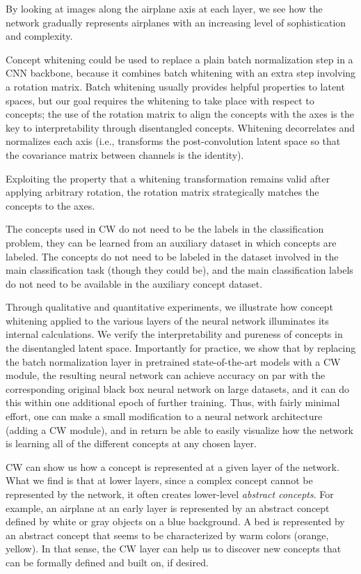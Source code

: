 \documentclass{article}
\begin{document}
By looking at images along the airplane axis at each layer, we see how the network gradually represents airplanes with an increasing level of sophistication and complexity. 

Concept whitening could be used to replace a plain batch normalization step in a CNN backbone, because it combines batch whitening with an extra step involving a rotation matrix. Batch whitening usually provides helpful properties to latent spaces, but our goal requires the whitening to take place with respect to concepts; the use of the rotation matrix to align the concepts with the axes is the key to interpretability through disentangled concepts. Whitening decorrelates and normalizes each axis (i.e., transforms the post-convolution latent space so that the covariance matrix between channels is the identity). 

Exploiting the property that a whitening transformation remains valid after applying arbitrary rotation, the rotation matrix strategically matches the concepts to the axes. 

The concepts used in CW do not need to be the labels in the classification problem, they can be learned from an auxiliary dataset in which concepts are labeled. The concepts do not need to be labeled in the dataset involved in the main classification task (though they could be), and the main classification labels do not need to be available in the auxiliary concept dataset. 

Through qualitative and quantitative experiments, we illustrate how concept whitening applied to the various layers of the neural network illuminates its internal calculations. We verify the interpretability and pureness of concepts in the disentangled latent space. Importantly for practice, we show that by replacing the batch normalization layer in pretrained state-of-the-art models with a CW module, the resulting neural network can achieve accuracy on par with the corresponding original black box neural network on large datasets, and it can do this within one additional epoch of further training. Thus, with fairly minimal effort, one can make a small modification to a neural network architecture (adding a CW module), and in return be able to easily visualize how the network is learning all of the different concepts at any chosen layer. 

CW can show us how a concept is represented at a given layer of the network. What we find is that at lower layers, since a complex concept cannot be represented by the network, it often creates lower-level \textit{abstract concepts}. For example, an airplane at an early layer is represented by an abstract concept defined by white or gray objects on a blue background. A bed is represented by an abstract concept that seems to be characterized by warm colors (orange, yellow). In that sense, the CW layer can help us to discover new concepts that can be formally defined and built on, if desired.
\end{document}
